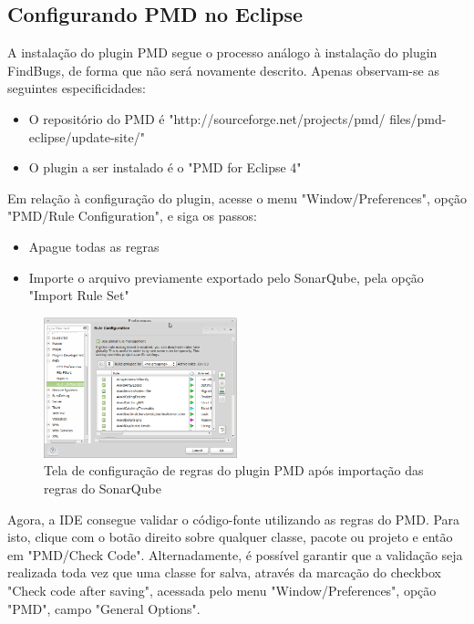 \documentclass[12pt,journal,compsoc]{IEEEtran}
\begin{document}
\subsection{Configurando PMD no Eclipse}

A instalação do plugin PMD\cite{pmd} segue o processo análogo à instalação do plugin FindBugs, de forma que não será novamente descrito. Apenas observam-se as seguintes especificidades:

\begin{itemize}
\item O repositório do PMD é "http://sourceforge.net/projects/pmd/
files/pmd-eclipse/update-site/"
\item O plugin a ser instalado é o "PMD for Eclipse 4"
\end{itemize}
  
Em relação à configuração do plugin, acesse o menu "Window/Preferences", opção "PMD/Rule Configuration", e siga os passos:

\begin{itemize}
\item Apague todas as regras 
\item Importe o arquivo previamente exportado pelo SonarQube, pela opção "Import Rule Set"
\end{itemize}

\begin{figure}[ht!]
\centering
\includegraphics[width=0.5\textwidth]{img/eclipse-pmd-01}
\caption{Tela de configuração de regras do plugin PMD após importação das regras do SonarQube}
\label{eclipse-pmd-01}
\end{figure}

Agora, a IDE consegue validar o código-fonte utilizando as regras do PMD. Para isto, clique com o botão direito sobre qualquer classe, pacote ou projeto e então em "PMD/Check Code". Alternadamente, é possível garantir que a validação seja realizada toda vez que uma classe for salva, através da marcação do checkbox "Check code after saving", acessada pelo menu "Window/Preferences", opção "PMD", campo "General Options".
\end{document}
